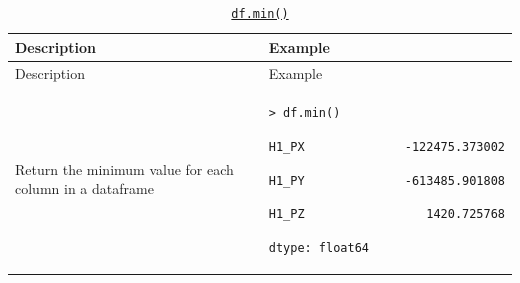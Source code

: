 \documentclass[10pt,a4paperpaper,]{article}
\begin{document}
\begin{longtable}[]{@{}ll@{}}
\caption{\href{http://pandas.pydata.org/pandas-docs/stable/generated/pandas.DataFrame.min.html}{\texttt{df.min()}}}\tabularnewline
\toprule
\begin{minipage}[b]{0.47\columnwidth}\raggedright\strut
Description\strut
\end{minipage} & \begin{minipage}[b]{0.47\columnwidth}\raggedright\strut
Example\strut
\end{minipage}\tabularnewline
\midrule
\endfirsthead
\toprule
\begin{minipage}[b]{0.47\columnwidth}\raggedright\strut
Description\strut
\end{minipage} & \begin{minipage}[b]{0.47\columnwidth}\raggedright\strut
Example\strut
\end{minipage}\tabularnewline
\midrule
\endhead
\begin{minipage}[t]{0.47\columnwidth}\raggedright\strut
Return the minimum value for each column in a dataframe\strut
\end{minipage} & \begin{minipage}[t]{0.47\columnwidth}\raggedright\strut
\texttt{\textgreater{}\ df.min()}

\texttt{H1\_PX\ \ \ \ \ \ \ \ \ \ \ \ \ \ -122475.373002}

\texttt{H1\_PY\ \ \ \ \ \ \ \ \ \ \ \ \ \ -613485.901808}

\texttt{H1\_PZ\ \ \ \ \ \ \ \ \ \ \ \ \ \ \ \ \ 1420.725768}

\texttt{dtype:\ float64}\strut
\end{minipage}\tabularnewline
\bottomrule
\end{longtable}
\end{document}
